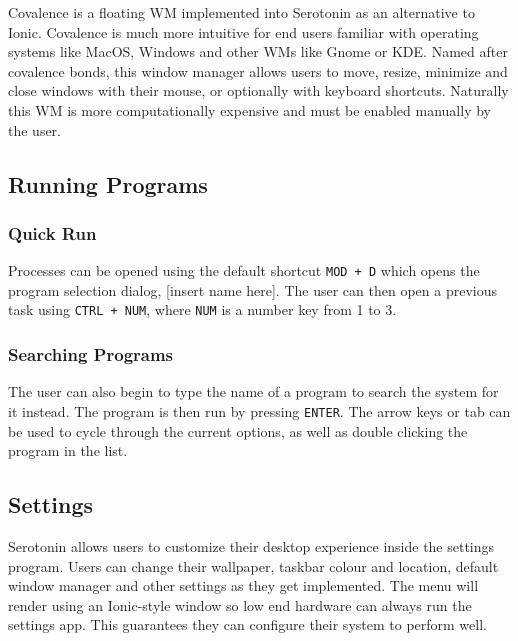 \documentclass[11pt,a4paper]{article}
\begin{document}
    Covalence is a floating WM implemented into Serotonin as an alternative to Ionic. Covalence is much more intuitive for end users familiar with operating systems like MacOS, Windows and other WMs like Gnome or KDE. Named after covalence bonds, this window manager allows users to move, resize, minimize and close windows with their mouse, or optionally with keyboard shortcuts. Naturally this WM is more computationally expensive and must be enabled manually by the user.

    \subsection{Running Programs}

    \subsubsection{Quick Run}

    Processes can be opened using the default shortcut \lstinline{MOD + D} which opens the program selection dialog, [insert name here]. The user can then open a previous task using \lstinline{CTRL + NUM}, where \lstinline{NUM} is a number key from 1 to 3.

    \subsubsection{Searching Programs}

    The user can also begin to type the name of a program to search the system for it instead. The program is then run by pressing \lstinline{ENTER}. The arrow keys or tab can be used to cycle through the current options, as well as double clicking the program in the list.

    \subsection{Settings}

    Serotonin allows users to customize their desktop experience inside the settings program. Users can change their wallpaper, taskbar colour and location, default window manager and other settings as they get implemented. The menu will render using an Ionic-style window so low end hardware can always run the settings app. This guarantees they can configure their system to perform well.
\end{document}
